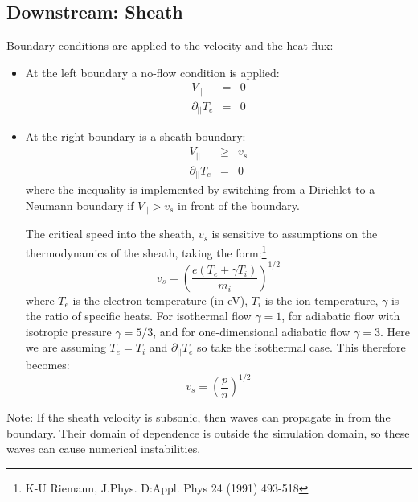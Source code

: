 \documentclass[12pt,a4paper]{article}
\begin{document}
\subsection{Downstream: Sheath}

Boundary conditions are applied to the velocity and the heat flux:
\begin{itemize}
\item  At the left boundary a no-flow condition is applied:
  \begin{eqnarray}
    V_{||} &=& 0 \nonumber \\
    \partial_{||}T_e &=& 0 \nonumber
  \end{eqnarray}
\item At the right boundary is a sheath boundary:
  \begin{eqnarray}
    V_{||} &\ge& v_s \nonumber \\
    \partial_{||}T_e &=& 0 \nonumber
  \end{eqnarray}
  where the inequality is implemented by switching from a Dirichlet to a Neumann boundary if $V_{||} > v_s$ in front of the boundary.
  
  The critical speed into the sheath, $v_s$ is sensitive to assumptions on the thermodynamics of the sheath, 
  taking the form:\footnote{K-U Riemann, J.Phys. D:Appl. Phys 24 (1991) 493-518}
  \begin{equation}
  v_s = \left( \frac{e\left(T_e + \gamma T_i\right)}{m_i}\right)^{1/2}
  \end{equation}
  where $T_e$  is the electron temperature (in eV), $T_i$ is the ion temperature, $\gamma$ is the ratio of specific heats. For isothermal flow $\gamma=1$, for adiabatic flow with isotropic pressure $\gamma=5/3$, and for one-dimensional adiabatic flow $\gamma=3$. Here we are assuming $T_e = T_i$ and $\partial_{||}T_e$ so take the isothermal case. This therefore becomes:
  \begin{equation}
    v_s = \left( \frac{p}{n}\right)^{1/2}
    \label{eq:sheath_speed}
  \end{equation}
\end{itemize}

Note: If the sheath velocity is subsonic, then waves can propagate in from the boundary. Their domain
of dependence is outside the simulation domain, so these waves can cause numerical instabilities.
\end{document}
